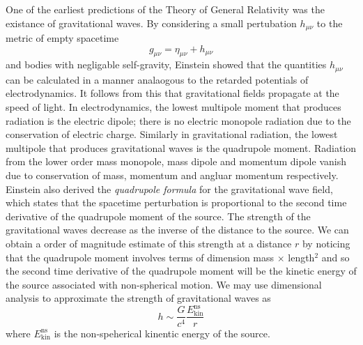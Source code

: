One of the earliest predictions of the Theory of General Relativity was the
existance of gravitational waves. By considering a small pertubation
$h_{\mu\nu}$ to the metric of empty spacetime
\begin{equation}
g_{\mu\nu} = \eta_{\mu\nu} + h_{\mu\nu}
\end{equation}
and bodies with negligable self-gravity, Einstein showed that the quantities
$h_{\mu\nu}$ can be calculated in a manner analaogous to the retarded
potentials of electrodynamics\cite{Einstein:1916}.  It follows from this that
gravitational fields propagate at the speed of light.  In electrodynamics, the
lowest multipole moment that produces radiation is the electric dipole; there
is no electric monopole radiation due to the conservation of electric charge.
Similarly in gravitational radiation, the lowest multipole that produces
gravitational waves is the quadrupole moment. Radiation from the lower order
mass monopole, mass dipole and momentum dipole vanish due to conservation of
mass, momentum and angluar momentum respectively. Einstein also derived the
\emph{quadrupole formula} for the gravitational wave field, which states that
the spacetime perturbation is proportional to the second time derivative of
the quadrupole moment of the source.  The strength of the gravitational waves
decrease as the inverse of the distance to the source.  We can obtain a order
of magnitude estimate of this strength at a distance $r$ by noticing that
the quadrupole moment involves terms of dimension mass $\times$ length$^2$ and
so the second time derivative of the quadrupole moment will be the kinetic
energy of the source associated with non-spherical motion.  We may use
dimensional analysis to approximate the strength of gravitational waves as
\begin{equation}
h \sim \frac{G}{c^4}\frac{E^\mathrm{ns}_\mathrm{kin}}{r}
\end{equation}
where $E^\mathrm{ns}_\mathrm{kin}$ is the non-speherical kinentic energy of
the source.

